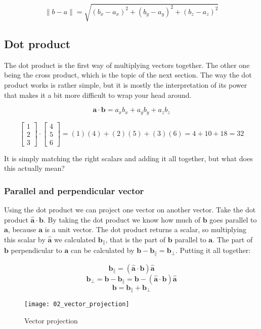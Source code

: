 $$\|b-a\|=\sqrt{(b_x-a_x)^2+(b_y-a_y)^2+(b_z-a_z)^2}$$

\subsection{Dot product}

The dot product is the first way of multiplying vectors together. The other one being the cross product, which is the topic of the next section. The way the dot product works is rather simple, but it is mostly the interpretation of its power that makes it a bit more difficult to wrap your head around.

$$\textbf{a}\cdot\textbf{b}=a_xb_x+a_yb_y+a_zb_z$$

$$
\begin{bmatrix}
1 \\ 2 \\ 3
\end{bmatrix} \cdot
\begin{bmatrix}
4 \\ 5 \\ 6
\end{bmatrix}=(1)(4)+(2)(5)+(3)(6)=4+10+18=32
$$

It is simply matching the right scalars and adding it all together, but what does this actually mean?

\subsubsection{Parallel and perpendicular vector}

Using the dot product we can project one vector on another vector. Take the dot product $\hat{\textbf{a}}\cdot\textbf{b}$. By taking the dot product we know how much of $\textbf{b}$ goes parallel to $\textbf{a}$, because $\textbf{a}$ is a unit vector. The dot product returns a scalar, so multiplying this scalar by $\hat{\textbf{a}}$ we calculated $\textbf{b}_\|$, that is the part of $\textbf{b}$ parallel to $\textbf{a}$. The part of $\textbf{b}$ perpendicular to $\textbf{a}$ can be calculated by $\textbf{b}-\textbf{b}_\|=\textbf{b}_\perp$. Putting it all together:

$$\textbf{b}_\|=(\hat{\textbf{a}}\cdot\textbf{b})\hat{\textbf{a}}$$
$$\textbf{b}_\perp=\textbf{b}-\textbf{b}_\|=\textbf{b}-(\hat{\textbf{a}}\cdot\textbf{b})\hat{\textbf{a}}$$
$$\textbf{b}=\textbf{b}_\|+\textbf{b}_\perp$$

\begin{figure}[H]
\centering
    \texttt{[image: 02\_vector\_projection]}
\caption{Vector projection}
\label{fig:vector-projection}
\end{figure}

